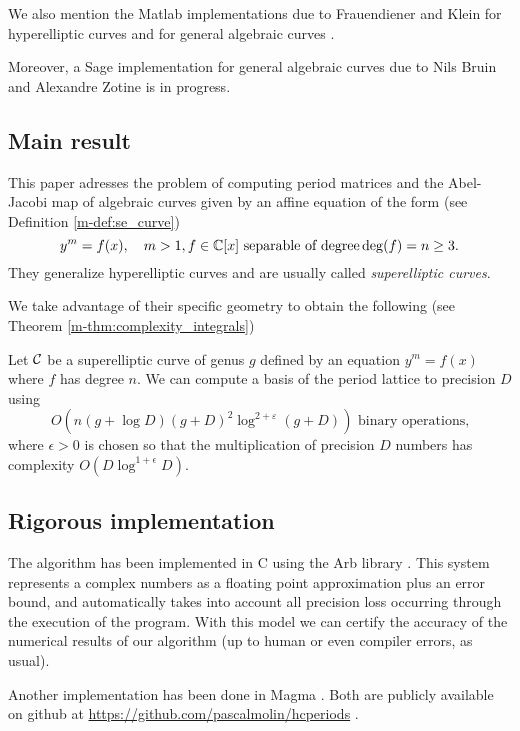 \documentclass[main.tex]{subfiles}
\begin{document}
  We also mention the Matlab implementations due to Frauendiener and Klein for hyperelliptic curves \cite{FrauendienerKlein2015}
    and for general algebraic curves \cite{FrauendienerKlein2011}.
  
  Moreover, a Sage implementation for general algebraic curves due to Nils Bruin and Alexandre Zotine is in progress.
  
  \subsection{Main result}

  This paper adresses the problem of computing period matrices and the
  Abel-Jacobi map of algebraic curves given by an affine equation of the form  (see Definition \ref{m-def:se_curve})
  \begin{equation*}
  y^m = f(x), \quad m > 1, f \in \mathbb{C}[x] \text{ separable of degree} \operatorname{deg}(f) = n \ge 3.
  \end{equation*}
  They generalize
  hyperelliptic curves and are usually called \textit{superelliptic curves}.

  We take advantage of their specific geometry to obtain the following
  (see Theorem \ref{m-thm:complexity_integrals})
  \begin{thm}
      Let $\mathcal{C}$ be a superelliptic curve of genus $g$ defined by an equation $y^m=f(x)$
      where $f$ has degree $n$.
      We can compute a basis of the period lattice to
      precision $D$ using $$O(n(g+\log D)(g+D)^2\log^{2+\varepsilon} (g+D)) \text{ binary operations,}$$
      where $\epsilon>0$ is chosen so that
      the multiplication of precision $D$ numbers has complexity
      $O(D\log^{1+\epsilon}D)$.
  \end{thm}

  \subsection{Rigorous implementation}
  \label{subsec:arb}

  The algorithm has been implemented in C using the Arb library \cite{Johansson2013arb}.
  This system represents a complex numbers as a floating point approximation
  plus an error bound, and automatically
  takes into account all precision loss occurring through the
  execution of the program. With this model we can certify
  the accuracy of the numerical results of our algorithm (up to human or even
  compiler errors, as usual).

  Another implementation has been done in Magma \cite{Magma}. Both are publicly available
  on github at \url{https://github.com/pascalmolin/hcperiods} \cite{githubhcperiods_2017_833727}.
\end{document}
